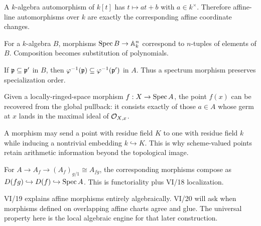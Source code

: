 \begin{example}
A $k$-algebra automorphism of $k[t]$ has $t\mapsto at+b$ with $a\in k^\times$.  Therefore affine-line automorphisms over $k$ are exactly the corresponding affine coordinate changes.
\end{example}

\begin{example}
For a $k$-algebra $B$, morphisms $\operatorname{Spec} B\to\mathbb A^n_k$ correspond to $n$-tuples of elements of $B$.  Composition becomes substitution of polynomials.
\end{example}

\begin{example}
If $\mathfrak p\subseteq\mathfrak p'$ in $B$, then $\varphi^{-1}(\mathfrak p)\subseteq\varphi^{-1}(\mathfrak p')$ in $A$.  Thus a spectrum morphism preserves specialization order.
\end{example}

\begin{example}
Given a locally-ringed-space morphism $f:X\to\operatorname{Spec} A$, the point $f(x)$ can be recovered from the global pullback: it consists exactly of those $a\in A$ whose germ at $x$ lands in the maximal ideal of $\mathcal O_{X,x}$.
\end{example}

\begin{example}
A morphism may send a point with residue field $K$ to one with residue field $k$ while inducing a nontrivial embedding $k\hookrightarrow K$.  This is why scheme-valued points retain arithmetic information beyond the topological image.
\end{example}

\begin{example}
For $A\to A_f\to(A_f)_{g/1}\cong A_{fg}$, the corresponding morphisms compose as $D(fg)\hookrightarrow D(f)\hookrightarrow\operatorname{Spec} A$.  This is functoriality plus VI/18 localization.
\end{example}

\begin{example}
VI/19 explains affine morphisms entirely algebraically.  VI/20 will ask when morphisms defined on overlapping affine charts agree and glue.  The universal property here is the local algebraic engine for that later construction.
\end{example}

